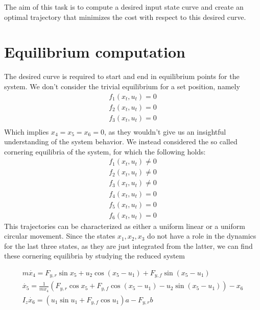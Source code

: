 The aim of this task is to compute a desired input state curve and create an optimal trajectory that minimizes the cost with respect to this desired curve. 

\section{Equilibrium computation}
The desired curve is required to start and end in equilibrium points for the system. We don't consider the trivial equilibrium for a set position, namely 
\begin{align*}
 f_1(x_t,u_t)=0 \\
 f_2(x_t,u_t)=0 \\
 f_3(x_t,u_t)=0 \\
\end{align*}
Which implies $x_4=x_5=x_6=0$, as they wouldn't give us an insightful understanding of the system behavior.
We instead considered the so called cornering equilibria of the system, for which the following holds:
\begin{align*}
 f_1(x_t,u_t) \neq 0 \\
 f_2(x_t,u_t) \neq 0 \\
 f_3(x_t,u_t) \neq 0 \\
 f_4(x_t,u_t)=0 \\
 f_5(x_t,u_t)=0 \\
 f_6(x_t,u_t)=0 
\end{align*}
This trajectories can be characterized as either a uniform linear or a uniform circular movement. 
Since the states $x_1, x_2, x_3$ do not have a role in the dynamics for the last three states, as they are just integrated from the latter, we can find these cornering equilibria by studying the reduced system

\begin{align*}
	m \dot{x_4} = F_{y,r} \sin x_5 + u_2 \cos (x_5 - u_1) + F_{y,f} \sin (x_5 - u_1) \\
    \dot{x_5} = \frac{1} {m x_4} (F_{y,r} \cos x_5 + F_{y,f} \cos(x_5 - u_1) - u_2 \sin (x_5 - u_1))-x_6
    \\
    I_z \dot{x_6} = (u_1 \sin u_1 + F_{y,f}\cos u_1 )a - F_{y,r} b   
\end{align*}
 
